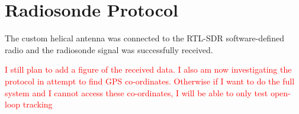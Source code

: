 \section{Radiosonde Protocol}

The custom helical antenna was connected to the RTL-SDR software-defined radio and the radiosonde signal was successfully received.

\textcolor{red}{I still plan to add a figure of the received data. I also am now investigating the protocol in attempt to find GPS co-ordinates. Otherwise if I want to do the full system and I cannot access these co-ordinates, I will be able to only test open-loop tracking}